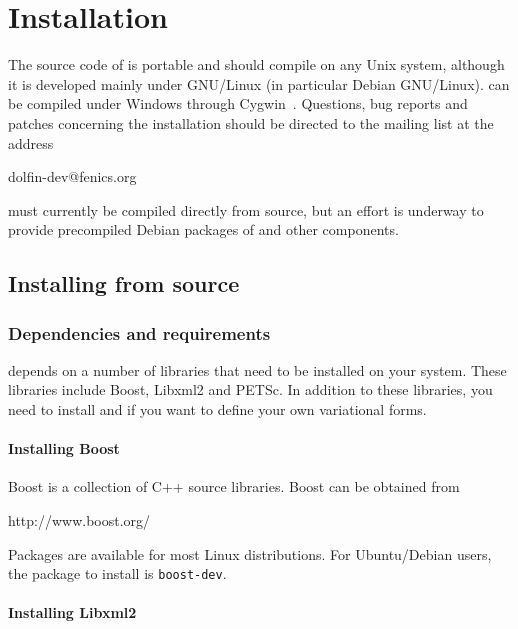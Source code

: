 \chapter{Installation}
\label{app:installation}

The source code of \dolfin{} is portable and should compile on any
Unix system, although it is developed mainly under GNU/Linux (in 
particular Debian GNU/Linux). \dolfin{} can be compiled under Windows
through Cygwin~\cite{www:Cygwin}. Questions, bug reports and patches
concerning the installation should be directed to the \dolfin{} mailing 
list at the address
\begin{code}
  dolfin-dev@fenics.org
\end{code}

\dolfin{} must currently be compiled directly from source, but an effort
is underway to provide precompiled Debian packages of \dolfin{} and
other \fenics{} components.

\section{Installing from source}

\subsection{Dependencies and requirements}

\dolfin{} depends on a number of libraries that need to be installed on your
system. These libraries include Boost, Libxml2 and PETSc. In addition to these 
libraries, you need to install \fiat{} and \ffc{} if you want to define your 
own variational forms.

\subsubsection{Installing Boost}

Boost is a collection of C++ source libraries. Boost can be obtained from
\begin{code}
  http://www.boost.org/
\end{code}
Packages are available for most Linux distributions. For Ubuntu/Debian users, the 
package to install is \texttt{boost-dev}.

\subsubsection{Installing Libxml2}

